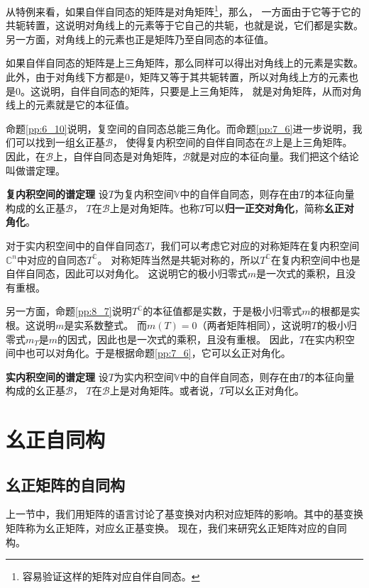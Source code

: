 \documentclass[12pt,UTF8,fontset=none]{ctexbook}
\begin{document}
从特例来看，如果自伴自同态的矩阵是对角矩阵\footnote{容易验证这样的矩阵对应自伴自同态。}，那么，
一方面由于它等于它的共轭转置，这说明对角线上的元素等于它自己的共轭，也就是说，它们都是实数。
另一方面，对角线上的元素也正是矩阵乃至自同态的本征值。

如果自伴自同态的矩阵是上三角矩阵，那么同样可以得出对角线上的元素是实数。此外，由于对角线下方都是0，矩阵又等于其共轭转置，所以对角线上方的元素也是0。这说明，自伴自同态的矩阵，只要是上三角矩阵，
就是对角矩阵，从而对角线上的元素就是它的本征值。

命题\ref{pp:6_10}说明，复空间的自同态总能三角化。而命题\ref{pp:7_6}进一步说明，我们可以找到一组幺正基$\mathcal{B}$，
使得复内积空间的自伴自同态在$\mathcal{B}$上是上三角矩阵。
因此，在$\mathcal{B}$上，自伴自同态是对角矩阵，$\mathcal{B}$就是对应的本征向量。我们把这个结论叫做谱定理。
\begin{pp}\textbf{复内积空间的谱定理 }\label{pp:8_8}
    设$T$为复内积空间$\mathbb{V}$中的自伴自同态，则存在由$T$的本征向量构成的幺正基$\mathcal{B}$，
    $T$在$\mathcal{B}$上是对角矩阵。也称$T$可以\textbf{归一正交对角化}，简称\textbf{幺正对角化}。
\end{pp}

对于实内积空间中的自伴自同态$T$，我们可以考虑它对应的对称矩阵在复内积空间$\mathbb{C}^n$中对应的自同态$T^{\mathbb{C}}$。
对称矩阵当然是共轭对称的，所以$T^{\mathbb{C}}$在复内积空间中也是自伴自同态，因此可以对角化。
这说明它的极小归零式$m$是一次式的乘积，且没有重根。

另一方面，命题\ref{pp:8_7}说明$T^{\mathbb{C}}$的本征值都是实数，于是极小归零式$m$的根都是实根。这说明$m$是实系数整式。
而$m(T) = 0$（两者矩阵相同），这说明$T$的极小归零式$m_T$是$m$的因式，因此也是一次式的乘积，且没有重根。
因此，$T$在实内积空间中也可以对角化。于是根据命题\ref{pp:7_6}，它可以幺正对角化。
\begin{pp}\textbf{实内积空间的谱定理 }\label{pp:8_8_0}
    设$T$为实内积空间$\mathbb{V}$中的自伴自同态，则存在由$T$的本征向量构成的幺正基$\mathcal{B}$，
    $T$在$\mathcal{B}$上是对角矩阵。或者说，$T$可以幺正对角化。
\end{pp}

\section{幺正自同构}
\subsection{幺正矩阵的自同构}
上一节中，我们用矩阵的语言讨论了基变换对内积对应矩阵的影响。其中的基变换矩阵称为幺正矩阵，对应幺正基变换。
现在，我们来研究幺正矩阵对应的自同构。
\end{document}

